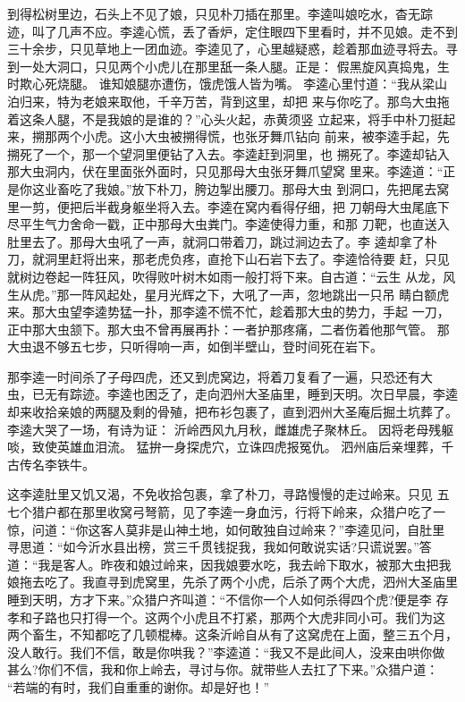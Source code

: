 到得松树里边，石头上不见了娘，只见朴刀插在那里。李逵叫娘吃水，杳无踪
迹，叫了几声不应。李逵心慌，丢了香炉，定住眼四下里看时，并不见娘。走不到
三十余步，只见草地上一团血迹。李逵见了，心里越疑惑，趁着那血迹寻将去。寻
到一处大洞口，只见两个小虎儿在那里舐一条人腿。正是：
假黑旋风真捣鬼，生时欺心死烧腿。
谁知娘腿亦遭伤，饿虎饿人皆为嘴。
李逵心里忖道：“我从梁山泊归来，特为老娘来取他，千辛万苦，背到这里，却把
来与你吃了。那鸟大虫拖着这条人腿，不是我娘的是谁的？”心头火起，赤黄须竖
立起来，将手中朴刀挺起来，搠那两个小虎。这小大虫被搠得慌，也张牙舞爪钻向
前来，被李逵手起，先搠死了一个，那一个望洞里便钻了入去。李逵赶到洞里，也
搠死了。李逵却钻入那大虫洞内，伏在里面张外面时，只见那母大虫张牙舞爪望窝
里来。李逵道：“正是你这业畜吃了我娘。”放下朴刀，胯边掣出腰刀。那母大虫
到洞口，先把尾去窝里一剪，便把后半截身躯坐将入去。李逵在窝内看得仔细，把
刀朝母大虫尾底下尽平生气力舍命一戳，正中那母大虫粪门。李逵使得力重，和那
刀靶，也直送入肚里去了。那母大虫吼了一声，就洞口带着刀，跳过涧边去了。李
逵却拿了朴刀，就洞里赶将出来，那老虎负疼，直抢下山石岩下去了。李逵恰待要
赶，只见就树边卷起一阵狂风，吹得败叶树木如雨一般打将下来。自古道：“云生
从龙，风生从虎。”那一阵风起处，星月光辉之下，大吼了一声，忽地跳出一只吊
睛白额虎来。那大虫望李逵势猛一扑，那李逵不慌不忙，趁着那大虫的势力，手起
一刀，正中那大虫颔下。那大虫不曾再展再扑：一者护那疼痛，二者伤着他那气管。
那大虫退不够五七步，只听得响一声，如倒半壁山，登时间死在岩下。

那李逵一时间杀了子母四虎，还又到虎窝边，将着刀复看了一遍，只恐还有大
虫，已无有踪迹。李逵也困乏了，走向泗州大圣庙里，睡到天明。次日早晨，李逵
却来收拾亲娘的两腿及剩的骨殖，把布衫包裹了，直到泗州大圣庵后掘土坑葬了。
李逵大哭了一场，有诗为证：
沂岭西风九月秋，雌雄虎子聚林丘。
因将老母残躯啖，致使英雄血泪流。
猛拚一身探虎穴，立诛四虎报冤仇。
泗州庙后亲埋葬，千古传名李铁牛。

这李逵肚里又饥又渴，不免收拾包裹，拿了朴刀，寻路慢慢的走过岭来。只见
五七个猎户都在那里收窝弓弩箭，见了李逵一身血污，行将下岭来，众猎户吃了一
惊，问道：“你这客人莫非是山神土地，如何敢独自过岭来？”李逵见问，自肚里
寻思道：“如今沂水县出榜，赏三千贯钱捉我，我如何敢说实话?只谎说罢。”答
道：“我是客人。昨夜和娘过岭来，因我娘要水吃，我去岭下取水，被那大虫把我
娘拖去吃了。我直寻到虎窝里，先杀了两个小虎，后杀了两个大虎，泗州大圣庙里
睡到天明，方才下来。”众猎户齐叫道：“不信你一个人如何杀得四个虎?便是李
存孝和子路也只打得一个。这两个小虎且不打紧，那两个大虎非同小可。我们为这
两个畜生，不知都吃了几顿棍棒。这条沂岭自从有了这窝虎在上面，整三五个月，
没人敢行。我们不信，敢是你哄我？”李逵道：“我又不是此间人，没来由哄你做
甚么?你们不信，我和你上岭去，寻讨与你。就带些人去扛了下来。”众猎户道：
“若端的有时，我们自重重的谢你。却是好也！”

